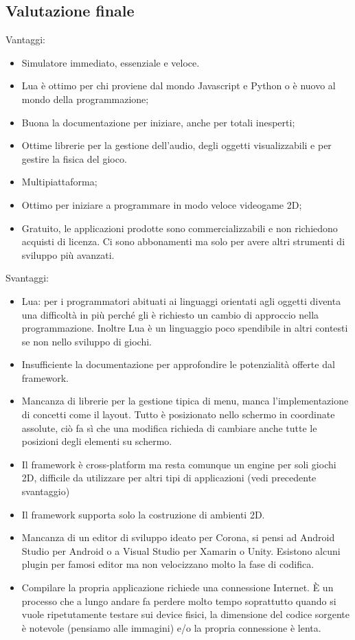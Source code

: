 	\subsection{Valutazione finale}
		Vantaggi:
		\begin{itemize}
			\item Simulatore immediato, essenziale e veloce.
			\item Lua è ottimo per chi proviene dal mondo Javascript e Python o è nuovo al mondo della programmazione;
			\item Buona la documentazione per iniziare, anche per totali inesperti;
			\item Ottime librerie per la gestione dell'audio, degli oggetti visualizzabili e per gestire la fisica del gioco.
			\item Multipiattaforma;
			\item Ottimo per iniziare a programmare in modo veloce videogame 2D;
			\item Gratuito, le applicazioni prodotte sono commercializzabili e non richiedono acquisti di licenza. Ci sono abbonamenti ma solo per avere altri strumenti di sviluppo più avanzati.
		\end{itemize}
		Svantaggi:
		\begin{itemize}
			\item Lua: per i programmatori abituati ai linguaggi orientati agli oggetti diventa una difficoltà in più perché gli è richiesto un cambio di approccio nella programmazione. Inoltre Lua è un linguaggio poco spendibile in altri contesti se non nello sviluppo di giochi.
			\item Insufficiente la documentazione per approfondire le potenzialità offerte dal framework.
			\item Mancanza di librerie per la gestione tipica di menu, manca l'implementazione di concetti come il layout. Tutto è posizionato nello schermo in coordinate assolute, ciò fa sì che una modifica richieda di cambiare anche tutte le posizioni degli elementi su schermo.
			\item Il framework è cross-platform ma resta comunque un engine per soli giochi 2D, difficile da utilizzare per altri tipi di applicazioni (vedi precedente svantaggio)
			\item Il framework supporta solo la costruzione di ambienti 2D.
			\item Mancanza di un editor di sviluppo ideato per Corona, si pensi ad Android Studio per Android o a Visual Studio per Xamarin o Unity. Esistono alcuni plugin per famosi editor ma non velocizzano molto la fase di codifica.
			\item Compilare la propria applicazione richiede una connessione Internet. È un processo che a lungo andare fa perdere molto tempo soprattutto quando si vuole ripetutamente testare sui device fisici, la dimensione del codice sorgente è notevole (pensiamo alle immagini) e/o la propria connessione è lenta.
		\end{itemize}
		
